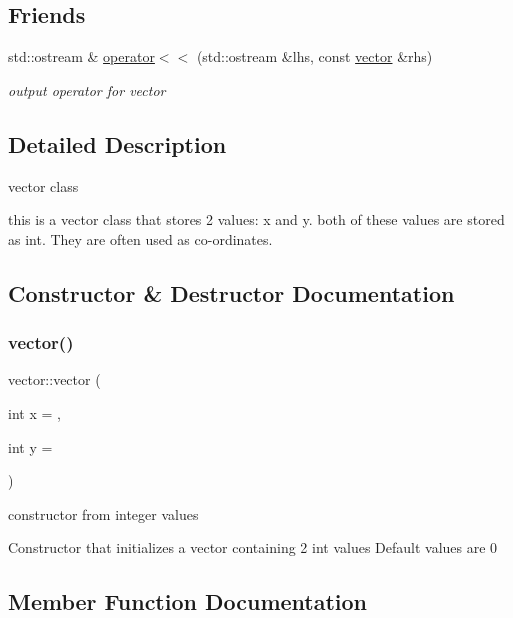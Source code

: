 \subsection*{Friends}
\begin{DoxyCompactItemize}
\item 
std\+::ostream \& \hyperlink{classvector_a7a6813f75dabd6f9575f9d6f91890255}{operator$<$$<$} (std\+::ostream \&lhs, const \hyperlink{classvector}{vector} \&rhs)
\begin{DoxyCompactList}\small\item\em output operator for vector \end{DoxyCompactList}\end{DoxyCompactItemize}


\subsection{Detailed Description}
vector class 

this is a vector class that stores 2 values\+: x and y. both of these values are stored as int. They are often used as co-\/ordinates. 

\subsection{Constructor \& Destructor Documentation}
\mbox{\label{classvector_ada69c108ec9393e6f70bdfcd58366cbf}} 
\subsubsection{\texorpdfstring{vector()}{vector()}}
{\footnotesize\ttfamily vector\+::vector (\begin{DoxyParamCaption}\item[{int}]{x = {},  }\item[{int}]{y = {} }\end{DoxyParamCaption})\hspace{0.3cm}{\ttfamily [inline]}}



constructor from integer values 

Constructor that initializes a vector containing 2 int values Default values are 0 

\subsection{Member Function Documentation}
\mbox{\label{classvector_ac4cc1a334af3576736c08768329dd886}} 
